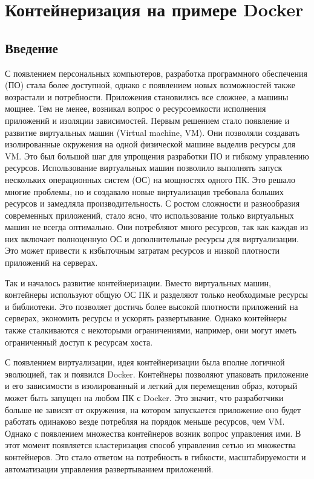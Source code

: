 \documentclass[letterpaper,10pt,russian]{sphinxmanual}
\begin{document}
\section{Контейнеризация на примере Docker}
\label{\detokenize{educational_materials/docker_base/content:docker}}\label{\detokenize{educational_materials/docker_base/content::doc}}

\subsection{Введение}
\label{\detokenize{educational_materials/docker_base/content:id1}}
\sphinxAtStartPar
С появлением персональных компьютеров, разработка программного обеспечения (ПО) стала более доступной, однако с появлением новых возможностей также возрастали и потребности. Приложения становились все сложнее, а машины \textendash{} мощнее. Тем не менее, возникал вопрос о ресурсоемкости исполнения приложений и изоляции зависимостей. Первым решением стало появление и развитие виртуальных машин (Virtual machine, VM). Они позволяли создавать изолированные окружения на одной физической машине выделив ресурсы для VM. Это был большой шаг для упрощения разработки ПО и гибкому управлению ресурсов. Использование виртуальных машин позволило выполнять запуск нескольких операционных систем (ОС) на мощностях одного ПК. Это решало многие проблемы, но и создавало новые \textendash{} виртуализация требовала больших ресурсов и замедляла производительность. С ростом сложности и разнообразия современных приложений, стало ясно, что использование только виртуальных машин не всегда оптимально. Они потребляют много ресурсов, так как каждая из них включает полноценную ОС и дополнительные ресурсы для виртуализации. Это может привести к избыточным затратам ресурсов и низкой плотности приложений на серверах.

\sphinxAtStartPar
Так и началось развитие контейнеризации. Вместо виртуальных машин, контейнеры используют общую ОС ПК и разделяют только необходимые ресурсы и библиотеки. Это позволяет достичь более высокой плотности приложений на серверах, экономить ресурсы и ускорять развертывание. Однако контейнеры также сталкиваются с некоторыми ограничениями, например, они могут иметь ограниченный доступ к ресурсам хоста.

\sphinxAtStartPar
С появлением виртуализации, идея контейнеризации была вполне логичной эволюцией, так и появился Docker. Контейнеры позволяют упаковать приложение и его зависимости в изолированный и легкий для перемещения образ, который может быть запущен на любом ПК с Docker. Это значит, что разработчики больше не зависят от окружения, на котором запускается приложение \textendash{} оно будет работать одинаково везде потребляя на порядок меньше ресурсов, чем VM. Однако с появлением множества контейнеров возник вопрос управления ими. В этот момент появляется кластеризация \textendash{} способ управления сетью из множества контейнеров. Это стало ответом на потребность в гибкости, масштабируемости и автоматизации управления развертыванием приложений.
\end{document}
